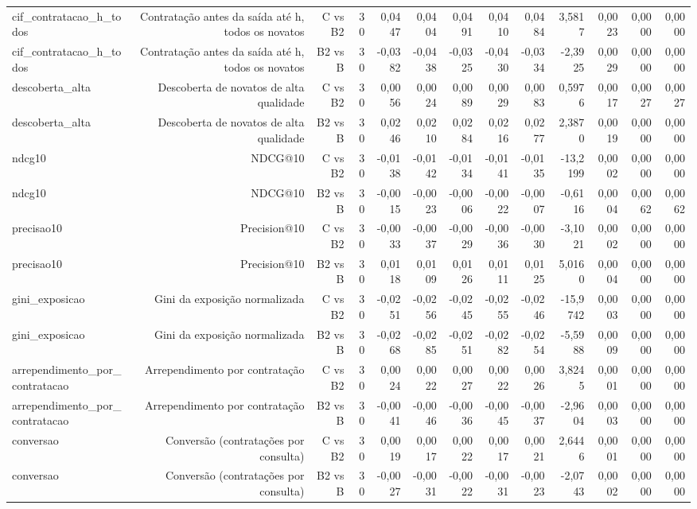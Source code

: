 \begin{table}[ht]
\begin{tabular}{lrrrrrrrrrrrr}
cif\_contratacao\_h\_todos & Contratação antes da saída até h, todos os novatos & C vs B2 & 30 & 0,0447 & 0,0404 & 0,0491 & 0,0410 & 0,0484 & 3,5817 & 0,0023 & 0,0000 & 0,0000 \\
cif\_contratacao\_h\_todos & Contratação antes da saída até h, todos os novatos & B2 vs B & 30 & -0,0382 & -0,0438 & -0,0325 & -0,0430 & -0,0334 & -2,3925 & 0,0029 & 0,0000 & 0,0000 \\
descoberta\_alta & Descoberta de novatos de alta qualidade & C vs B2 & 30 & 0,0056 & 0,0024 & 0,0089 & 0,0029 & 0,0083 & 0,5976 & 0,0017 & 0,0027 & 0,0027 \\
descoberta\_alta & Descoberta de novatos de alta qualidade & B2 vs B & 30 & 0,0246 & 0,0210 & 0,0284 & 0,0216 & 0,0277 & 2,3870 & 0,0019 & 0,0000 & 0,0000 \\
ndcg10 & NDCG@10 & C vs B2 & 30 & -0,0138 & -0,0142 & -0,0134 & -0,0141 & -0,0135 & -13,2199 & 0,0002 & 0,0000 & 0,0000 \\
ndcg10 & NDCG@10 & B2 vs B & 30 & -0,0015 & -0,0023 & -0,0006 & -0,0022 & -0,0007 & -0,6116 & 0,0004 & 0,0062 & 0,0062 \\
precisao10 & Precision@10 & C vs B2 & 30 & -0,0033 & -0,0037 & -0,0029 & -0,0036 & -0,0030 & -3,1021 & 0,0002 & 0,0000 & 0,0000 \\
precisao10 & Precision@10 & B2 vs B & 30 & 0,0118 & 0,0109 & 0,0126 & 0,0111 & 0,0125 & 5,0160 & 0,0004 & 0,0000 & 0,0000 \\
gini\_exposicao & Gini da exposição normalizada & C vs B2 & 30 & -0,0251 & -0,0256 & -0,0245 & -0,0255 & -0,0246 & -15,9742 & 0,0003 & 0,0000 & 0,0000 \\
gini\_exposicao & Gini da exposição normalizada & B2 vs B & 30 & -0,0268 & -0,0285 & -0,0251 & -0,0282 & -0,0254 & -5,5988 & 0,0009 & 0,0000 & 0,0000 \\
arrependimento\_por\_contratacao & Arrependimento por contratação & C vs B2 & 30 & 0,0024 & 0,0022 & 0,0027 & 0,0022 & 0,0026 & 3,8245 & 0,0001 & 0,0000 & 0,0000 \\
arrependimento\_por\_contratacao & Arrependimento por contratação & B2 vs B & 30 & -0,0041 & -0,0046 & -0,0036 & -0,0045 & -0,0037 & -2,9604 & 0,0003 & 0,0000 & 0,0000 \\
conversao & Conversão (contratações por consulta) & C vs B2 & 30 & 0,0019 & 0,0017 & 0,0022 & 0,0017 & 0,0021 & 2,6446 & 0,0001 & 0,0000 & 0,0000 \\
conversao & Conversão (contratações por consulta) & B2 vs B & 30 & -0,0027 & -0,0031 & -0,0022 & -0,0031 & -0,0023 & -2,0743 & 0,0002 & 0,0000 & 0,0000 \\
\hline
\end{tabular}
\end{table}
